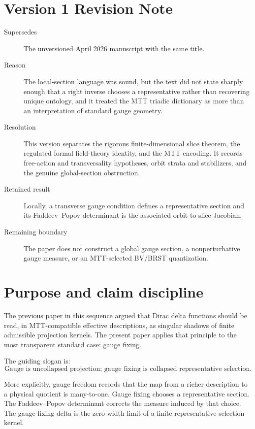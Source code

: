 \documentclass[11pt]{article}
\begin{document}
\section*{Version 1 Revision Note}
\begin{description}
\item[Supersedes] The unversioned April 2026 manuscript with the same title.
\item[Reason] The local-section language was sound, but the text did not
state sharply enough that a right inverse chooses a representative rather
than recovering unique ontology, and it treated the MTT triadic dictionary
as more than an interpretation of standard gauge geometry.
\item[Resolution] This version separates the rigorous finite-dimensional
slice theorem, the regulated formal field-theory identity, and the MTT
encoding.  It records free-action and transversality hypotheses, orbit
strata and stabilizers, and the genuine global-section obstruction.
\item[Retained result] Locally, a transverse gauge condition defines a
representative section and its Faddeev--Popov determinant is the associated
orbit-to-slice Jacobian.
\item[Remaining boundary] The paper does not construct a global gauge
section, a nonperturbative gauge measure, or an MTT-selected BV/BRST
quantization.
\end{description}

\seriestagline

\tableofcontents

\section{Purpose and claim discipline}

The previous paper in this sequence argued that Dirac delta functions should be read, in MTT-compatible effective descriptions, as singular shadows of finite admissible projection kernels. The present paper applies that principle to the most transparent standard case: gauge fixing.

The guiding slogan is:
\[
\boxed{\text{Gauge is uncollapsed projection; gauge fixing is collapsed representative selection.}}
\]

More explicitly, gauge freedom records that the map from a richer description to a physical quotient is many-to-one. Gauge fixing chooses a representative section. The Faddeev--Popov determinant corrects the measure induced by that choice. The gauge-fixing delta is the zero-width limit of a finite representative-selection kernel.
\end{document}

